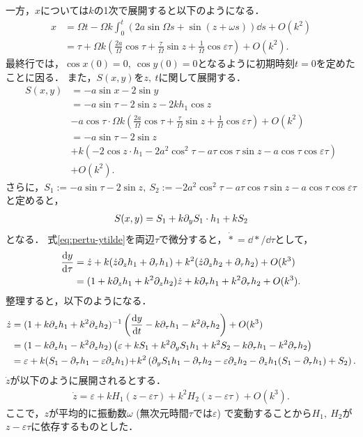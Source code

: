 \documentclass[../main]{subfiles}
\begin{document}
    一方，$x$については$k$の1次で展開すると以下のようになる．
    \begin{align*}
        x&=\Omega t-\Omega k\int_0^t(2a\sin \Omega s+\sin (z+\omega s))\dd{s}+O(k^2)\\ 
        &=\tau+\Omega k\left(\frac{2a}{\Omega}\cos\tau+\frac{\tau}{\Omega}\sin z+\frac{1}{\Omega}\cos \varepsilon \tau\right)+O(k^2).
    \end{align*}
    最終行では，$\cos x(0)=0,\ \cos y(0)=0$となるように初期時刻$t=0$を定めたことに因る．
    また，$S(x,y)$を$z,\ t$に関して展開する．
    \begin{align*}
        S(x,y)&=-a\sin x-2\sin y\\
        &=-a\sin\tau-2\sin z-2 kh_1\cos z\\
        &-a\cos\tau\cdot \Omega k\left(\frac{2a}{\Omega}\cos \tau+\frac{\tau}{\Omega}\sin z+\frac{1}{\Omega}\cos \varepsilon \tau\right)+O(k^2)\\
        &=-a\sin\tau-2\sin z\\
        &+k\left(-2 \cos z\cdot h_1-2a^2\cos^2\tau-a\tau\cos \tau\sin z-a\cos\tau\cos\varepsilon\tau\right)\\
        &+O(k^2).
    \end{align*}
    さらに，$S_1:=-a\sin\tau-2\sin z,\ S_2:=-2a^2\cos^2\tau-a\tau\cos \tau\sin z-a\cos\tau\cos\varepsilon\tau$と定めると，
    \begin{align*}
        S(x,y)=S_1+k\partial_y S_1\cdot h_1+kS_2
    \end{align*}
    となる．
    式\eqref{eq:pertu-ytilde}を両辺$\tau$で微分すると，$\dot{\ast}=\dd{\ast}/\dd{\tau}$として，
    \begin{align*}
        \dv{y}{\tau}&=\dot{z}+k(\dot{z}\partial_zh_1+\partial_\tau h_1)+k^2(\dot{z}\partial_zh_2+\partial_\tau h_2)+O(k^3)\\
        &=(1+k\partial_zh_1+k^2\partial_zh_2)\dot{z}+k\partial_\tau h_1+k^2\partial_\tau h_2+O(k^3).
    \end{align*}
    整理すると，以下のようになる．
    \begin{align*}
        \dot{z}&=(1+k\partial_zh_1+k^2\partial_zh_2)^{-1}\left( \dv{y}{t}-k\partial_\tau h_1-k^2\partial_\tau h_2 \right)+O(k^3)\\
        &=(1-k\partial_zh_1-k^2\partial_zh_2)\left(\varepsilon+kS_1+k^2 \partial_y S_1h_1+k^2S_2-k\partial_\tau h_1-k^2\partial_\tau h_2 \right)\\
        &=\varepsilon+k(S_1-\partial_\tau h_1-\varepsilon\partial_zh_1)\!+\!k^2\left(\partial_y S_1h_1 -\partial_\tau h_2-\varepsilon\partial_zh_2 -\partial_zh_1(S_1-\partial_\tau h_1)+S_2\right).
    \end{align*}
    $\dot{z}$が以下のように展開されるとする．
    \begin{align}
        \dot{z}=\varepsilon+kH_1(z-\varepsilon \tau)+k^2H_2(z-\varepsilon \tau)+O(k^3).
    \end{align}
    ここで，$z$が平均的に振動数$\omega$ (無次元時間$\tau$では$\varepsilon$) で変動することから$H_1,\ H_2$が$z-\varepsilon \tau$に依存するものとした．
    
\end{document}
